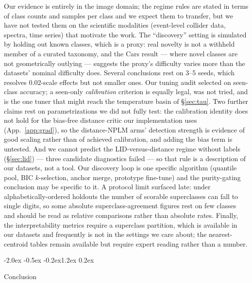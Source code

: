 \documentclass{article}
\makeatletter
\renewcommand\section{\@startsection{section}{1}{\z@}%
  {-2.0ex \@plus -0.5ex \@minus -0.2ex}{1.2ex \@plus 0.2ex}%
  {\large\bf\raggedright}}
\makeatother
\begin{document}
Our evidence is entirely in the image domain; the regime rules are stated in
terms of class counts and samples per class and we expect them to transfer, but
we have not tested them on the scientific modalities (event-level collider
data, spectra, time series) that motivate the work. The ``discovery'' setting
is simulated by holding out known classes, which is a proxy: real novelty is
not a withheld member of a curated taxonomy, and the Cars result --- where
novel classes are not geometrically outlying --- suggests the proxy's
difficulty varies more than the datasets' nominal difficulty does. Several
conclusions rest on 3--5 seeds, which resolves $0.02$-scale effects but not
smaller ones. Our tuning audit selected on seen-class accuracy; a seen-only
\emph{calibration} criterion is equally legal, was not tried, and is the one
tuner that might reach the temperature basin of \S\ref{sec:tau}. Two further
claims rest on parametrizations we did not fully test: the calibration identity does not hold for the bias-free
distance critic our implementation uses (App.~\ref{app:grad}), so the
distance-NPLM arms' detection strength is evidence of good scaling rather than
of achieved calibration, and adding the bias term is untested. And we cannot
predict the LID-versus-distance regime without labels
(\S\ref{sec:lid}) --- three candidate diagnostics failed --- so that rule is a
description of our datasets, not a tool. Our discovery loop is one specific algorithm (quantile pool, BIC
$k$-selection, anchor merge, prototype fine-tune) and the purity-gating
conclusion may be specific to it. A protocol limit surfaced late: under alphabetically-ordered
holdouts the number of scorable superclasses can fall to single digits, so some
absolute superclass-agreement figures rest on few classes and should be read as
relative comparisons rather than absolute rates. Finally, the interpretability
metrics require a superclass partition, which is available in our datasets and frequently is
not in the settings we care about; the nearest-centroid tables remain
available but require expert reading rather than a number.

\section{Conclusion}
\end{document}
